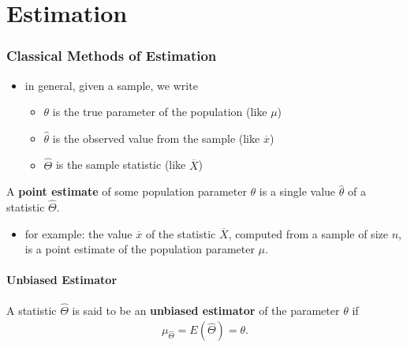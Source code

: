 \documentclass[10pt]{article}
\begin{document}
\newpage
\part{Estimation}

\section{Classical Methods of Estimation}
\begin{itemize}
    \item in general, given a sample, we write 
        \begin{itemize}
            \item $\theta$ is the true parameter of the population (like $\mu$)
            \item $ \hat{\theta}$ is the observed value from the sample (like $\overline{x}$)
            \item $\hat{\Theta}$ is the sample statistic (like $\overline{X}$)
        \end{itemize}
\end{itemize}
\begin{definition}
    A \textbf{point estimate} of some population parameter $\theta$ is a single value $\hat{\theta}$ of a statistic $\hat{\Theta}$.
    \begin{itemize}
        \item for example: the value $\overline{x}$ of the statistic $\overline{X}$, computed from a sample of size $n$, is a point estimate of the population parameter $\mu$.
    \end{itemize}
\end{definition}

\subsection{Unbiased Estimator}
\begin{definition}
    A statistic $\hat{\Theta}$ is said to be an \textbf{unbiased estimator} of the parameter $\theta$ if 
    \begin{gather*}
        \mu_{\hat{\Theta}} = E(\hat{\Theta}) = \theta
    .\end{gather*}
\end{definition}
\end{document}
